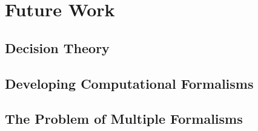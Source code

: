 \section{Future Work}\label{sec:future_work}


\subsection{Decision Theory}  %


\subsection{Developing Computational Formalisms}  %


\subsection{The Problem of Multiple Formalisms}  %

